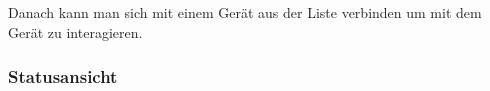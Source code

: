 Danach kann man sich mit einem Gerät aus der Liste verbinden um mit dem Gerät zu interagieren.

\subsubsection{Statusansicht}
\label{subsubsec:Statusansicht}
\centerline{
}
